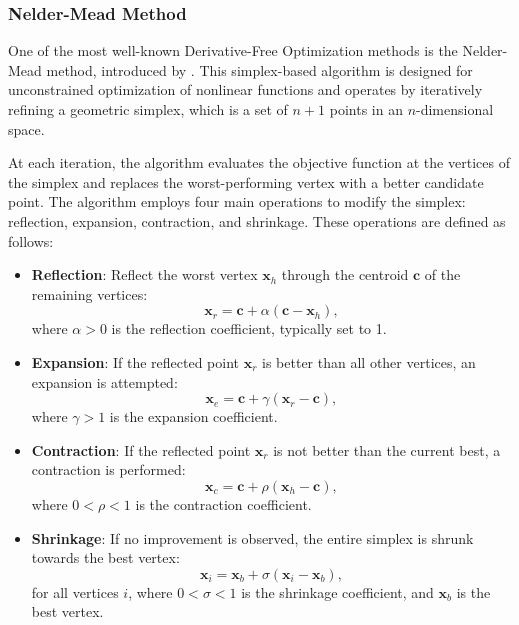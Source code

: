 \subsubsection{Nelder-Mead Method}
\label{subsubsection:nelder_mead}
One of the most well-known Derivative-Free Optimization methods is the Nelder-Mead method, introduced by \citet{nelder1965simplex}. This simplex-based algorithm is designed for unconstrained optimization of nonlinear functions and operates by iteratively refining a geometric simplex, which is a set of \(n+1\) points in an \(n\)-dimensional space.

At each iteration, the algorithm evaluates the objective function at the vertices of the simplex and replaces the worst-performing vertex with a better candidate point. The algorithm employs four main operations to modify the simplex: reflection, expansion, contraction, and shrinkage. These operations are defined as follows:

\begin{itemize}
    \item \textbf{Reflection}: Reflect the worst vertex \(\mathbf{x}_h\) through the centroid \(\mathbf{c}\) of the remaining vertices:
    \begin{equation}
    \mathbf{x}_r = \mathbf{c} + \alpha (\mathbf{c} - \mathbf{x}_h),
    \end{equation}
    where \(\alpha > 0\) is the reflection coefficient, typically set to 1.

\item \textbf{Expansion}: If the reflected point \(\mathbf{x}_r\) is better than all other vertices, an expansion is attempted:
\begin{equation}
\mathbf{x}_e = \mathbf{c} + \gamma (\mathbf{x}_r - \mathbf{c}),
\end{equation}
where \(\gamma > 1\) is the expansion coefficient.

\item \textbf{Contraction}: If the reflected point \(\mathbf{x}_r\) is not better than the current best, a contraction is performed:
\begin{equation}
\mathbf{x}_c = \mathbf{c} + \rho (\mathbf{x}_h - \mathbf{c}),
\end{equation}
where \(0 < \rho < 1\) is the contraction coefficient.

\item \textbf{Shrinkage}: If no improvement is observed, the entire simplex is shrunk towards the best vertex:
\begin{equation}
\mathbf{x}_i = \mathbf{x}_b + \sigma (\mathbf{x}_i - \mathbf{x}_b),
\end{equation}
for all vertices \(i\), where \(0 < \sigma < 1\) is the shrinkage coefficient, and \(\mathbf{x}_b\) is the best vertex.
\end{itemize}


